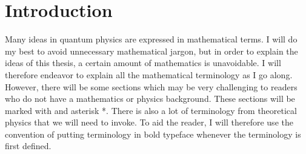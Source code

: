 \chapter{Introduction}
Many ideas in quantum physics are expressed in mathematical terms. I will do my best to avoid unnecessary mathematical jargon, but in order to explain the ideas of this thesis, a certain amount of mathematics is unavoidable. I will therefore endeavor to explain all the mathematical terminology as I go along. However, there will be some sections which may be very challenging to readers who do not have a mathematics or physics background. These sections will be marked with and asterisk *.\label{asteriskmeaning} There is also a lot of terminology from theoretical physics that we will need to invoke. To aid the reader, I will therefore use the convention of putting terminology in bold typeface whenever the terminology is first defined.